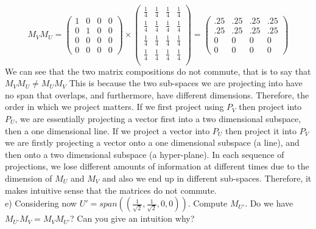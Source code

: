 \documentclass[12pt,twoside]{article}
\begin{document}
$$
    M_V M_U = 
    \begin{pmatrix}
    1 & 0 & 0 & 0\\
    0 & 1 & 0 & 0\\
    0 & 0 & 0 & 0\\
    0 & 0 & 0 & 0 
    \end{pmatrix} \times
    \begin{pmatrix}
        \frac{1}{4} & \frac{1}{4} & \frac{1}{4} & \frac{1}{4} \\
        \frac{1}{4} & \frac{1}{4} & \frac{1}{4} & \frac{1}{4} \\
        \frac{1}{4} & \frac{1}{4} & \frac{1}{4} & \frac{1}{4} \\
        \frac{1}{4} & \frac{1}{4} & \frac{1}{4} & \frac{1}{4} \\
    \end{pmatrix}
    =
    \begin{pmatrix}
    .25 & .25 & .25 & .25\\
    .25 & .25 & .25 & .25\\
    0 & 0 & 0 & 0\\
    0 & 0 & 0 & 0 
    \end{pmatrix}
$$
We can see that the two matrix compositions do not commute, that is to say that $M_VM_U \neq M_UM_V$ This is because the two sub-spaces we are projecting into have no span that overlaps, and furthermore, have different dimensions. Therefore, the order in which we project matters. If we first project using $P_V$ then project into $P_U$, we are essentially projecting a vector first into a two dimensional subspace, then a one dimensional line. If we project a vector into $P_U$ then project it into $P_V$ we are firstly projecting a vector onto a one dimensional subspace (a line), and then onto a two dimensional subspace (a hyper-plane). In each sequence of projections, we lose different amounts of information at different times due to the dimension of $M_U$ and $M_V$ and also we end up in different sub-spaces. Therefore, it makes intuitive sense that the matrices do not commute. \\

e) Considering now $ U' = span \left((\frac{1}{\sqrt{2}}, \frac{1}{ \sqrt{2}}, 0, 0)\right)$. Compute $M_{U'}$. Do we have $M_{U'}M_V = M_{V}M_{U'}$? Can you give an intuition why?\\
\end{document}
